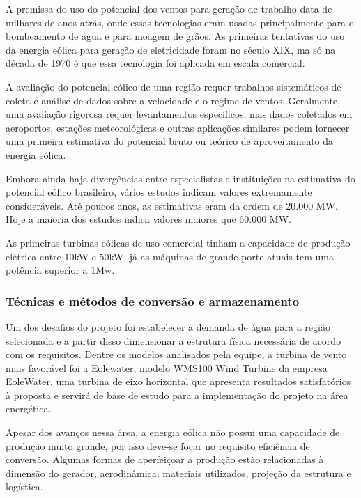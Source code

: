     A premissa do uso do potencial dos ventos para geração de trabalho data de milhares de anos atrás, onde essas tecnologias
    eram usadas principalmente para o bombeamento de água e para moagem de grãos. As primeiras tentativas do uso da energia
    eólica para geração de eletricidade foram no século XIX, ma só na década de 1970 é que essa tecnologia foi aplicada em
    escala comercial.
    
    A avaliação do potencial eólico de uma região requer trabalhos sistemáticos de coleta e análise de dados sobre a velocidade
    e o regime de ventos. Geralmente, uma avaliação rigorosa requer levantamentos específicos, mas dados coletados em 
    aeroportos, estações meteorológicas e outras aplicações similares podem fornecer uma primeira estimativa do potencial
    bruto ou teórico de aproveitamento da energia eólica.
    
    Embora ainda haja divergências entre especialistas e instituições na estimativa do potencial eólico brasileiro, 
    vários estudos indicam valores extremamente consideráveis. Até poucos anos, as estimativas eram da ordem de 20.000 MW.
    Hoje a maioria dos estudos indica valores maiores que 60.000 MW.
    
    As primeiras turbinas eólicas de uso comercial tinham a capacidade de produção elétrica entre 10kW e 50kW, já
    as máquinas de grande porte atuais tem uma potência superior a 1Mw. 
    
  \subsubsection{Técnicas e métodos de conversão e armazenamento}
    
    Um dos desafios do projeto foi estabelecer a demanda de água para a região selecionada e a partir disso dimensionar a
    estrutura física necessária de acordo com os requisitos. Dentre os modelos analisados pela equipe, a turbina de vento 
    mais favorável foi a Eolewater, modelo WMS100 Wind Turbine da empresa EoleWater, uma turbina de eixo horizontal que
    apresenta resultados satisfatórios à proposta e servirá de base de estudo para a implementação do projeto na área 
    energética.
    
    Apesar dos avanços nessa área, a energia eólica não possui uma capacidade de produção muito grande, por isso deve-se
    focar no requisito eficiência de conversão. Algumas formas de aperfeiçoar a produção estão relacionadas à dimensão do 
    gerador, aerodinâmica, materiais utilizados, projeção da estrutura e logística.
    
